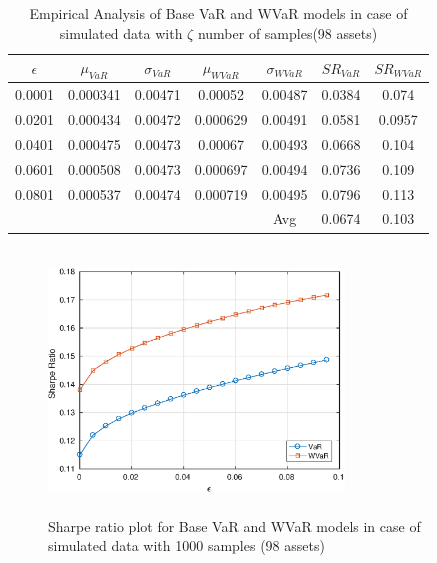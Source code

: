 \documentclass[12pt]{article}
\numberwithin{equation}{section}
\begin{document}
\begin{table}[!h]
\centering
\captionsetup{justification=centering}
\begin{tabular}{||c|c|c|c|c|c|c||}
\hline
$\epsilon$ & $\mu_{VaR}$ & $\sigma_{VaR}$ & $\mu_{WVaR}$ & $\sigma_{WVaR}$ & $SR_{VaR}$ & $SR_{WVaR}$\\
\hline
0.0001 & 0.000341 & 0.00471 & 0.00052 & 0.00487 & 0.0384 & 0.074 \\
0.0201 & 0.000434 & 0.00472 & 0.000629 & 0.00491 & 0.0581 & 0.0957 \\
0.0401 & 0.000475 & 0.00473 & 0.00067 & 0.00493 & 0.0668 & 0.104 \\
0.0601 & 0.000508 & 0.00473 & 0.000697 & 0.00494 & 0.0736 & 0.109 \\
0.0801 & 0.000537 & 0.00474 & 0.000719 & 0.00495 & 0.0796 & 0.113 \\
\hline
& & & & Avg & 0.0674 & 0.103 \\
\hline
\end{tabular}
\caption{Empirical Analysis of Base VaR and WVaR models in case of simulated data with $\zeta$ number of samples(98 assets)}
\label{tab:5.5}
\end{table}

\begin{figure}[!h]
\centering
\includegraphics[height=7.0cm,width=0.7\textwidth]{VaR/bse100_simulated/sr_1000_cheb.eps}
\caption{Sharpe ratio plot for Base VaR and WVaR models in case of simulated data with 1000 samples (98 assets)}
\label{fig:5.6}
\end{figure}
\end{document}
